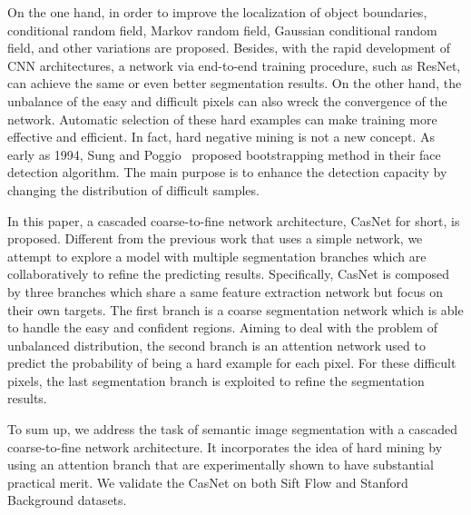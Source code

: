 \documentclass[10.5pt,compsoc]{TsT}
\newcommand{\upcite}[1]{\superscript{\textsuperscript{\cite{#1}}}}
\theoremstyle{mystyle}
\newcommand{\upcite}[1]{\textsuperscript{\cite{#1}}}
\begin{document}
{On the one hand, in order to improve the localization of object boundaries, conditional random field, Markov random field, Gaussian conditional random field, and other variations are proposed. Besides, with the rapid development of CNN architectures, a network via end-to-end training procedure, such as ResNet\upcite{1}, can achieve the same or even better segmentation results. On the other hand, the unbalance of the easy and difficult pixels can also wreck the convergence of the network. Automatic selection of these hard examples can make training more effective and efficient. In fact, hard negative mining is not a new concept. As early as 1994, Sung and Poggio~\upcite{5} proposed bootstrapping method in their face detection algorithm. The main purpose is to enhance the detection capacity by changing the distribution of difficult samples. 

In this paper, a cascaded coarse-to-fine network architecture, CasNet for short, is proposed. Different from the previous work that uses a simple network, we attempt to explore a model with multiple segmentation branches which are collaboratively to refine the predicting results. Specifically, CasNet is composed by three branches which share a same feature extraction network but focus on their own targets. The first branch is a coarse segmentation network which is able to handle the easy and confident regions. Aiming to deal with the problem of unbalanced distribution, the second branch is an attention network used to predict the probability of being a hard example for each pixel. For these difficult pixels, the last segmentation branch is exploited to refine the segmentation results. 

To sum up, we address the task of semantic image segmentation with a cascaded coarse-to-fine network architecture. It incorporates the idea of hard mining by using an attention branch that are experimentally shown to have substantial practical merit. We validate the CasNet on both Sift Flow\upcite{6} and Stanford Background\upcite{7} datasets.


}
\end{document}

